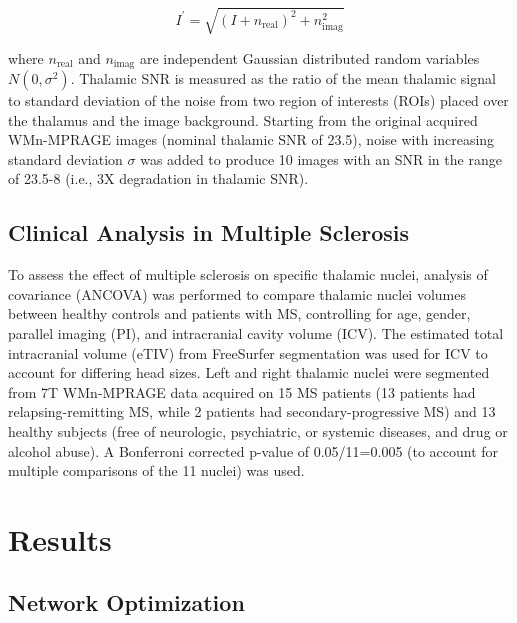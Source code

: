 \begin{equation}
\label{eq:thalamus.eq.5.iprime}
I^{'}=\sqrt{{\left(I+n_{\text{real}}\right)}^{2}+n_{\text{imag}}^{2}}
\end{equation}

where $n_{\text{real}} $ and $n_{\text{imag}} $ are independent Gaussian distributed random variables $N(0,\sigma ^{2})$. Thalamic SNR is measured as the ratio of the mean thalamic signal to standard deviation of the noise from two region of interests (ROIs) placed over the thalamus and the image background. Starting from the original acquired WMn-MPRAGE images (nominal thalamic SNR of 23.5), noise with increasing standard deviation $\sigma  $ was added to produce 10 images with an SNR in the range of 23.5-8 (i.e., 3X degradation in thalamic SNR).

\subsection{Clinical Analysis in Multiple Sclerosis}
To assess the effect of multiple sclerosis on specific thalamic nuclei, analysis of covariance (ANCOVA) was performed to compare thalamic nuclei volumes between healthy controls and patients with MS, controlling for age, gender, parallel imaging (PI), and intracranial cavity volume (ICV). The estimated total intracranial volume (eTIV) from FreeSurfer segmentation was used for ICV to account for differing head sizes. Left and right thalamic nuclei were segmented from 7T WMn-MPRAGE data acquired on 15 MS patients (13 patients had relapsing-remitting MS, while 2 patients had secondary-progressive MS) and 13 healthy subjects (free of neurologic, psychiatric, or systemic diseases, and drug or alcohol abuse). A Bonferroni corrected p-value of 0.05/11=0.005 (to account for multiple comparisons of the 11 nuclei) was used.

\section{Results}

\subsection{Network Optimization}

